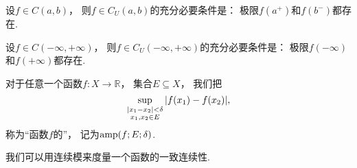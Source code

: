 \begin{theorem}\label{theorem:极限.闭区间上连续函数的性质.开区间上的连续函数一致连续的充分必要条件1}
设\(f \in C(a,b)\)，
则\(f \in C_U(a,b)\)的充分必要条件是：
极限\(f(a^+)\)和\(f(b^-)\)都存在.
\end{theorem}

\begin{theorem}\label{theorem:极限.闭区间上连续函数的性质.开区间上的连续函数一致连续的充分必要条件2}
设\(f \in C(-\infty,+\infty)\)，
则\(f \in C_U(-\infty,+\infty)\)的充分必要条件是：
极限\(f(-\infty)\)和\(f(+\infty)\)都存在.
\end{theorem}

\begin{definition}
对于任意一个函数\(f\colon X\to\mathbb{R}\)，
集合\(E \subseteq X\)，
我们把\[
	\sup_{\substack{
		\abs{x_1-x_2}<\delta \\
		x_1,x_2 \in E
	}}\abs{f(x_1)-f(x_2)},
\]
称为“函数\(f\)的”，
记为\(\operatorname{amp}(f;E;\delta)\).
\end{definition}

我们可以用连续模来度量一个函数的一致连续性.
